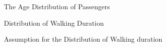 \documentclass[Journal,letterpaper]{ascelike-new}
\begin{document}
%
\begin{figure}[htp]
    \caption{The Age Distribution of Passengers}
    \label{fig:3}
    \centering
\end{figure}

%
\begin{figure}[htp]
    \caption{Distribution of Walking Duration}
    \label{fig:4}
    \centering
\end{figure}

%
\begin{figure}[htp]
    \caption{Assumption for the Distribution of Walking duration}
    \label{fig:5}
    \centering
\end{figure}
\end{document}
